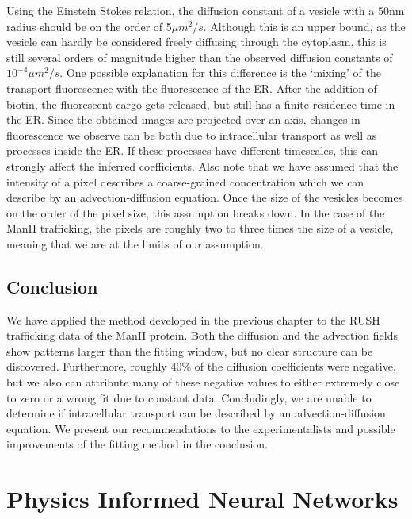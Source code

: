 \documentclass{Dissertate}
\begin{document}
Using the Einstein Stokes relation, the diffusion constant of a vesicle with a 50nm radius should be on the order of 5$\mu m^2/s$. Although this is an upper bound, as the vesicle can hardly be considered freely diffusing through the cytoplasm, this is still several orders of magnitude higher than the observed diffusion constants of $10^{-4}\mu m^2/s$. One possible explanation for this difference is the `mixing' of the transport fluorescence with the fluorescence of the
ER. After the addition of biotin, the fluorescent cargo gets released,
but still has a finite residence time in the ER. Since the obtained
images are projected over an axis, changes in fluorescence we observe
can be both due to intracellular transport as well as processes inside
the ER. If these processes have different timescales, this can strongly
affect the inferred coefficients. 
Also note that we have assumed that the intensity of a pixel describes a coarse-grained concentration which we can describe by an advection-diffusion equation. Once the size of the vesicles becomes on the order of the pixel size, this assumption breaks down. In the case of the ManII trafficking, the pixels are roughly two to three times the size of a vesicle, meaning that we are at the limits of our assumption. 

\hypertarget{conclusion}{%
\section{Conclusion}\label{conclusion}}

We have applied the method developed in the previous chapter to the RUSH
trafficking data of the ManII protein. Both the diffusion and the advection fields show patterns larger than the fitting window, but no clear structure can be discovered. Furthermore, roughly 40\% of the diffusion coefficients were negative, but we also can attribute many of these negative values to either extremely close to zero or a wrong fit due to constant data. Concludingly, we are unable to determine if intracellular transport can be described by an advection-diffusion equation. We present our recommendations to the experimentalists and possible improvements of the fitting method in the conclusion. 

\hypertarget{physics-informed-neural-networks}{%
\chapter{Physics Informed Neural
Networks}\label{physics-informed-neural-networks}}
\end{document}
